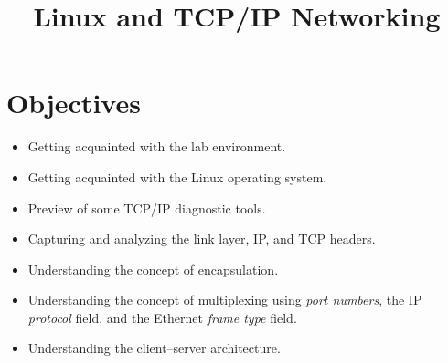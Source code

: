 \documentclass{../UTNetLab}
\title{Linux and TCP/IP Networking}
\begin{document}
\section*{Objectives}
\begin{itemize}
    \item Getting acquainted with the lab environment.
    \item Getting acquainted with the Linux operating system.
    \item Preview of some TCP/IP diagnostic tools.
    \item Capturing and analyzing the link layer, IP, and TCP headers.
    \item Understanding the concept of encapsulation.
    \item Understanding the concept of multiplexing using \textit{port numbers}, the IP \textit{protocol} field, and the Ethernet \textit{frame type} field.
    \item Understanding the client–server architecture.
\end{itemize}
\end{document}
